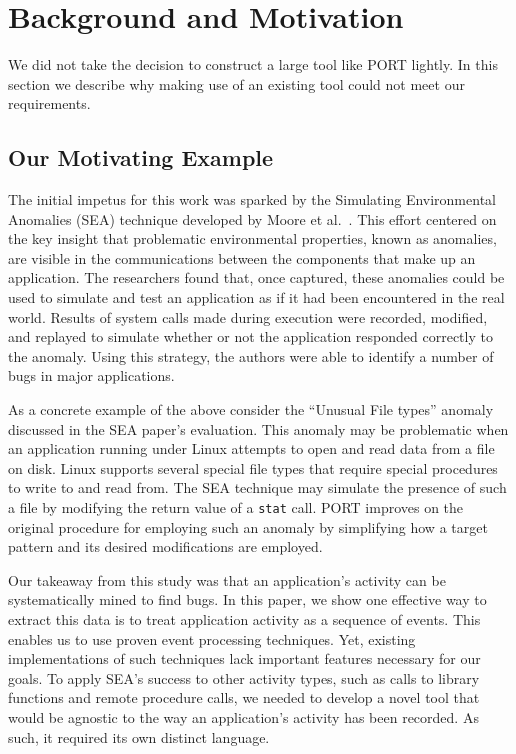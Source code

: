 \section{Background and Motivation}
\label{SEC:background}

We did not take the decision to construct a large tool like PORT lightly.  In this section we describe why making use of an existing tool could not meet our requirements.

\subsection{Our Motivating Example}
\label{sec:MotivatingExample}

The initial impetus for this work was sparked by the Simulating Environmental Anomalies (SEA) technique developed by Moore et al.~\cite{DBLP:conf/issre/MooreCFW19}.
This effort centered on the key insight
that problematic
environmental properties,
known as anomalies, are visible in the
communications between the components that make up an application.
The researchers found that,
once captured,
these anomalies
could be
used to simulate and 
test
an application as if
it had been encountered
in the real world.
Results of system calls made
during execution were recorded, modified, and replayed to simulate whether or not the application
responded correctly to the anomaly.
Using this strategy, the authors were able to identify a number of bugs
in major applications.

As a concrete example of the above
consider the ``Unusual File types'' anomaly
discussed in the SEA paper's evaluation.
This anomaly may be problematic
when an application running under Linux
attempts to open and read data from a file on disk.
Linux supports several special file types  that require special procedures to 
write to and
read from.
The SEA technique
may simulate the presence of such a file by
modifying
the return value
of a {\tt stat} call.
PORT improves on the original procedure for employing such an anomaly
by simplifying how a target pattern
and its desired modifications are employed.

Our takeaway
from this study
was that an application's activity
can be systematically mined to find bugs.
In this paper, we
show one effective way to extract this data
is to treat application activity
as a sequence of events. This enables us to use
proven event processing techniques. 
Yet, existing
implementations of such techniques
lack important features necessary for our goals.
 To apply
SEA's success to other activity types,
such as calls to library functions
and remote procedure calls, we needed to develop a novel tool that would be  agnostic to the way an application's activity has been recorded. As such, it required its own  distinct language. 


